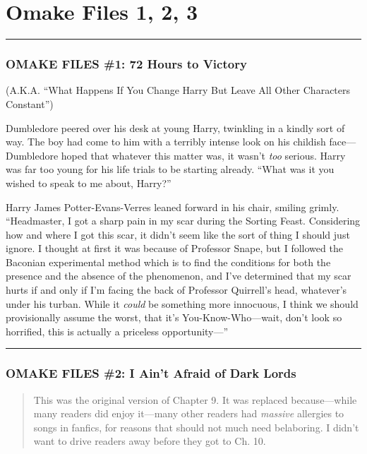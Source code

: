 \chapter{Omake Files 1, 2, 3}\label{omake-files-1-2-3}

\begin{center}\rule{3in}{0.4pt}\end{center}

\subsection{OMAKE FILES \#1: 72 Hours to
Victory}\label{omake-files-1-72-hours-to-victory}

(A.K.A. ``What Happens If You Change Harry But Leave All Other
Characters Constant'')

Dumbledore peered over his desk at young Harry, twinkling in a kindly
sort of way. The boy had come to him with a terribly intense look on his
childish face---Dumbledore hoped that whatever this matter was, it
wasn't \emph{too} serious. Harry was far too young for his life trials
to be starting already. ``What was it you wished to speak to me about,
Harry?''

Harry James Potter-Evans-Verres leaned forward in his chair, smiling
grimly. ``Headmaster, I got a sharp pain in my scar during the Sorting
Feast. Considering how and where I got this scar, it didn't seem like
the sort of thing I should just ignore. I thought at first it was
because of Professor Snape, but I followed the Baconian experimental
method which is to find the conditions for both the presence and the
absence of the phenomenon, and I've determined that my scar hurts if and
only if I'm facing the back of Professor Quirrell's head, whatever's
under his turban. While it \emph{could} be something more innocuous, I
think we should provisionally assume the worst, that it's
You-Know-Who---wait, don't look so horrified, this is actually a
priceless opportunity---''

\begin{center}\rule{3in}{0.4pt}\end{center}

\subsection{OMAKE FILES \#2: I Ain't Afraid of Dark
Lords}\label{omake-files-2-i-aint-afraid-of-dark-lords}

\begin{quote}
This was the original version of Chapter 9. It was replaced
because---while many readers did enjoy it---many other readers had
\emph{massive} allergies to songs in fanfics, for reasons that should
not much need belaboring. I didn't want to drive readers away before
they got to Ch. 10.
\end{quote}

